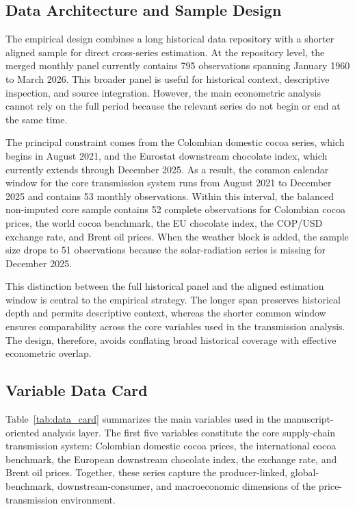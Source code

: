 \documentclass[11pt]{article}
\begin{document}
\subsection{Data Architecture and Sample Design}

The empirical design combines a long historical data repository with a shorter aligned sample for direct cross-series estimation. At the repository level, the merged monthly panel currently contains 795 observations spanning January 1960 to March 2026. This broader panel is useful for historical context, descriptive inspection, and source integration. However, the main econometric analysis cannot rely on the full period because the relevant series do not begin or end at the same time.

The principal constraint comes from the Colombian domestic cocoa series, which begins in August 2021, and the Eurostat downstream chocolate index, which currently extends through December 2025. As a result, the common calendar window for the core transmission system runs from August 2021 to December 2025 and contains 53 monthly observations. Within this interval, the balanced non-imputed core sample contains 52 complete observations for Colombian cocoa prices, the world cocoa benchmark, the EU chocolate index, the COP/USD exchange rate, and Brent oil prices. When the weather block is added, the sample size drops to 51 observations because the solar-radiation series is missing for December 2025.

This distinction between the full historical panel and the aligned estimation window is central to the empirical strategy. The longer span preserves historical depth and permits descriptive context, whereas the shorter common window ensures comparability across the core variables used in the transmission analysis. The design, therefore, avoids conflating broad historical coverage with effective econometric overlap.

\subsection{Variable Data Card}

Table~\ref{tab:data_card} summarizes the main variables used in the manuscript-oriented analysis layer. The first five variables constitute the core supply-chain transmission system: Colombian domestic cocoa prices, the international cocoa benchmark, the European downstream chocolate index, the exchange rate, and Brent oil prices. Together, these series capture the producer-linked, global-benchmark, downstream-consumer, and macroeconomic dimensions of the price-transmission environment.
\end{document}
